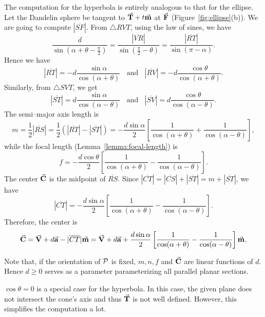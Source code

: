 The computation for the hyperbola is entirely analogous to that for the
ellipse.  Let the Dandelin sphere  be 
tangent to 
$\vec{\bf T}+t\vec{\bf m}$ at $\vec{\bf F}$ (Figure~\ref{fig:ellipse}(b)). 
We are going to compute $|\overline{SF}|$.  
From $\bigtriangleup RVT$, using the law of sines, we have
\[ \frac{d}{\sin\left(\alpha+\theta-\frac{\pi}{2}\right)}=
     \frac{|\overline{VR}|}{\sin\left(\frac{\pi}{2}-\theta\right)} = 
     \frac{|\overline{RT}|}{\sin(\pi-\alpha)}. \]
Hence we have
\[ |\overline{RT}|=-d\frac{\sin\alpha}{\cos(\alpha+\theta)}\ \ \ \ \mbox{and}
     \ \ \ \ |\overline{RV}|=-d\frac{\cos\theta}{\cos(\alpha+\theta)}. \]
Similarly, from $\bigtriangleup SVT$, we get
\[ |\overline{ST}|=d\frac{\sin\alpha}{\cos(\alpha-\theta)}\ \ \ \ \mbox{and}
     \ \ \ \ |\overline{SV}|=d\frac{\cos\theta}{\cos(\alpha-\theta)}. \]
The semi--major axis length is
\[    m=\frac{1}{2}|\overline{RS}|=\frac{1}{2}(|\overline{RT}|-|\overline{ST}|)
     =-\frac{d\sin\alpha}{2}\left[
                    \frac{1}{\cos(\alpha+\theta)} +
                    \frac{1}{\cos(\alpha-\theta)} \right],  \]
while the focal length (Lemma~\ref{lemma:focal-length}) is
\[     f=-\frac{d\cos\theta}{2}\left[
                    \frac{1}{\cos(\alpha+\theta)} -
                    \frac{1}{\cos(\alpha-\theta)} \right]. \]
The center $\vec{\bf C}$ is the midpoint of $\overline{RS}$.  
Since $|\overline{CT}|=|\overline{CS}|+|\overline{ST}|=m+|\overline{ST}|$,
we have
\[ |\overline{CT}|=-\frac{d\sin\alpha}{2}\left[
        \frac{1}{\cos(\alpha+\theta)}-\frac{1}{\cos(\alpha-\theta)}\right]. \]
Therefore, the center is
\[  \vec{\bf C} = \vec{\bf V}+d\vec{\bf a}-|\overline{CT}|\vec{\bf m} 
              = \vec{\bf V}+d\vec{\bf a}+\frac{d\sin\alpha}{2}\left[
        \frac{1}{\cos(\alpha+\theta)}-\frac{1}{\cos(\alpha-\theta)}\right]
          \vec{\bf m}.   \]
\fi
\QED

     Note that, if the orientation of ${\cal P}$ is fixed, $m, n, f$ and 
$\vec{\bf C}$ are linear functions of $d$.  Hence  $d\geq 0$ serves as a 
parameter parameterizing all parallel planar sections.

     $\cos \theta = 0$ is a special case for the hyperbola.  In this case, the
given plane does not intersect the cone's axis and thus $\vec{\bf T}$ is not
well defined.  However, this simplifies the computation a lot.

